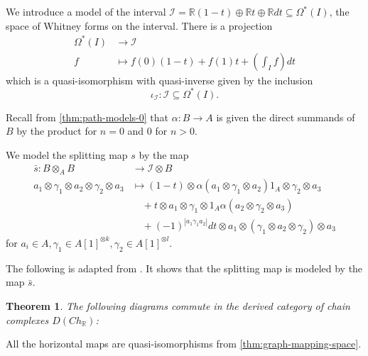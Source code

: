 \documentclass{scrartcl}
\theoremstyle{plain}
\newtheorem{theorem}{Theorem}[section]
\theoremstyle{definition}
\newcommand{\R}{\mathbb R}
\newcommand{\abs}[1]{\left\lvert#1\right\rvert}
\renewcommand{\subset}{\subseteq}
\DeclareMathOperator{\Map}{Map}
\begin{document}
We introduce a model of the interval $\mathcal I = \R (1-t) \oplus \R t \oplus \R dt\subset \Omega^*(I)$, the space of Whitney forms on the interval. There is a projection 
\begin{align*}
    \Omega^*(I) &\to \mathcal I\\
    f&\mapsto f(0)(1-t) + f(1) t + \left(\int_I f\right) dt
\end{align*}
which is a quasi-isomorphism with quasi-inverse given by the inclusion $$\iota_{\mathcal I}\colon \mathcal I \subset \Omega^*(I).$$ 

Recall from \cref{thm:path-models-0} that $\alpha\colon B\to A$ is given the direct summands of $B$ by the product for $n=0$ and $0$ for $n>0$.

We model the splitting map $s$ by the map 
\begin{align*}
    \bar s \colon B\otimes_A B&\to \mathcal I\otimes B \\
    a_1 \otimes \gamma_1 \otimes a_2 \otimes \gamma_2 \otimes a_3 &\mapsto  (1-t) \otimes \alpha (a_1 \otimes \gamma_1 \otimes a_2)1_A \otimes \gamma_2 \otimes a_3 \\
    &\quad+ t\otimes a_1 \otimes \gamma_1 \otimes 1_A \alpha (a_2 \otimes \gamma_2 \otimes a_3)  \\
    &\quad +  (-1) ^{\abs{a_1\gamma_1a_2}} dt\otimes a_1 \otimes (\gamma_1\otimes a_2\otimes \gamma_2) \otimes a_3
\end{align*}
for $a_i\in A, \gamma_1\in A[1]^{\otimes k}, \gamma_2\in A[1]^{\otimes l}$.

The following is adapted from \cite[Prop. 4.2]{naef2019string}. It shows that the splitting map is modeled by the map $\bar s$. 
\begin{theorem}\label{thm:model-splitting}
    The following diagrams commute in the derived category of chain complexes $D(Ch_\R)$:

    \qquad
\end{theorem}
All the horizontal maps are quasi-isomorphisms from \cref{thm:graph-mapping-space}.
\end{document}
